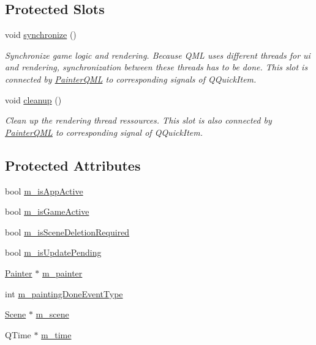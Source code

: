 \subsection*{Protected Slots}
\begin{DoxyCompactItemize}
\item 
void \hyperlink{class_painter_q_m_l_a4cfd22a52fc9e29d304c0ff7cea86744}{synchronize} ()
\begin{DoxyCompactList}\small\item\em Synchronize game logic and rendering.  Because Q\+M\+L uses different threads for ui and rendering, synchronization between these threads has to be done. This slot is connected by \hyperlink{class_painter_q_m_l}{Painter\+Q\+M\+L} to corresponding signals of Q\+Quick\+Item. \end{DoxyCompactList}\item 
void \hyperlink{class_painter_q_m_l_ab07e4719d2b05bbbfa48980b4854d190}{cleanup} ()
\begin{DoxyCompactList}\small\item\em Clean up the rendering thread ressources.  This slot is also connected by \hyperlink{class_painter_q_m_l}{Painter\+Q\+M\+L} to corresponding signal of Q\+Quick\+Item. \end{DoxyCompactList}\end{DoxyCompactItemize}
\subsection*{Protected Attributes}
\begin{DoxyCompactItemize}
\item 
bool \hyperlink{class_painter_q_m_l_a9acde8bb9dae70089141153efe168690}{m\+\_\+is\+App\+Active}
\item 
bool \hyperlink{class_painter_q_m_l_ab6aae1f8b8723eb4ebe7677ddc18ee11}{m\+\_\+is\+Game\+Active}
\item 
bool \hyperlink{class_painter_q_m_l_ae2e60015d5cc12a5fb5b5d0402189532}{m\+\_\+is\+Scene\+Deletion\+Required}
\item 
bool \hyperlink{class_painter_q_m_l_a3b291f7043ad8437baadf6d7be1c174d}{m\+\_\+is\+Update\+Pending}
\item 
\hyperlink{class_painter}{Painter} $\ast$ \hyperlink{class_painter_q_m_l_a6b21bae1a75260e121bc56cda38729c8}{m\+\_\+painter}
\item 
int \hyperlink{class_painter_q_m_l_a7a6641710573e4fa47dfdae13e87d58e}{m\+\_\+painting\+Done\+Event\+Type}
\item 
\hyperlink{class_scene}{Scene} $\ast$ \hyperlink{class_painter_q_m_l_a5eccac2ab6d9974a9ae94573ac7b19d6}{m\+\_\+scene}
\item 
Q\+Time $\ast$ \hyperlink{class_painter_q_m_l_ad4ced718f47b69f2344a5311ec87a156}{m\+\_\+time}
\end{DoxyCompactItemize}
